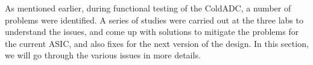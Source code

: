 \label{sec:5}

As mentioned earlier, during functional testing of the ColdADC, a number of problems were identified. A series of studies were carried out at the three labs to understand the issues, and come up with solutions to mitigate the problems for the current ASIC, and also fixes for the next version of the design. In this section, we will go through the various issues in more details. 

